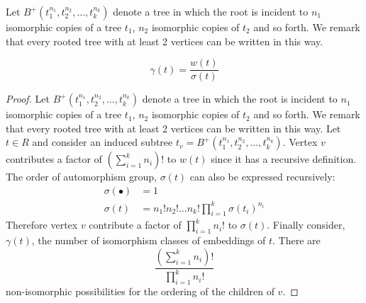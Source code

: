  Let $B^{+}(t_1^{n_1},t_2^{n_2},\dots,t_k^{n_k})$ denote a tree in which the root is incident to $n_1$ isomorphic copies 
 of a tree $t_1$, $n_2$ isomorphic copies of $t_2$ and so forth.  We remark that every rooted tree with at least 2 vertices can 
 be written in this way.
\begin{lem}
 \begin{equation}\label{eq:3}
  \gamma(t) = \frac{w(t)}{\sigma(t)}
 \end{equation}
\end{lem}
\begin{proof}
 Let $B^{+}(t_1^{n_1},t_2^{n_2},\dots,t_k^{n_k})$ denote a tree in which the root is incident to $n_1$ isomorphic copies 
 of a tree $t_1$, $n_2$ isomorphic copies of $t_2$ and so forth.  We remark that every rooted tree with at least 2 vertices can 
 be written in this way.  Let $t  \in R$ and consider an induced subtree $t_v = B^{+}(t_1^{n_1},t_2^{n_2},\dots,t_k^{n_k})$. 
 Vertex $v$ contributes a factor of $\left( \sum_{i=1}^k n_i \right)! $ to $w(t)$ since it has a recursive definition.  The order of 
 automorphism group, $\sigma(t)$ can also be expressed recursively:
 \begin{align}
  \sigma(\bullet) &= 1 \\
  \sigma(t) &= n_1 ! n_2! \dots n_k ! \prod_{i=1}^k\sigma(t_i)^{n_i} 
 \end{align}
Therefore vertex $v$ contribute a factor of $\prod_{i=1}^k n_i !$ to $\sigma(t)$.  Finally consider, $\gamma(t)$, the number of isomorphism classes of embeddings of $t$.  
There are 
\[
 \frac{\left(\sum_{i=1}^k n_i \right)!}{\prod_{i=1}^k n_i!}
\]
non-isomorphic possibilities for the ordering of the children of $v$.
\end{proof}

